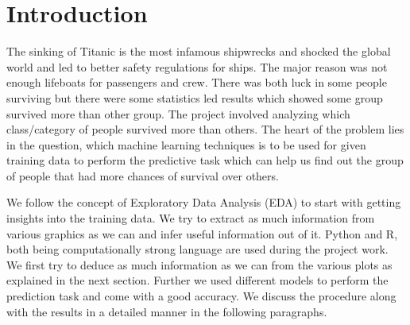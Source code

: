 \section{Introduction}
\vspace{-0.1in}
The sinking of Titanic is the most infamous shipwrecks and shocked the global world and led to better safety regulations for ships. The major reason was not enough lifeboats for passengers and crew. There was both luck in some people surviving but there were some statistics led results which showed some group survived more than other group. The project involved analyzing which class/category of people survived more than others. The heart of the problem lies in the question, which machine learning techniques is to be used for given training data to perform the predictive task which can help us ﬁnd out the group of people that had more chances of survival over others.

We follow the concept of Exploratory Data Analysis (EDA) to start with getting insights into the training data. We try to extract as much information from various graphics as we can and infer useful information out of it. Python and R, both being computationally strong language are used during the project work. We first try to deduce as much information as we can from the various plots as explained in the next section. Further we used different models to perform the prediction task and come with a good accuracy. We discuss the procedure along with the results in a detailed manner in the following paragraphs.
